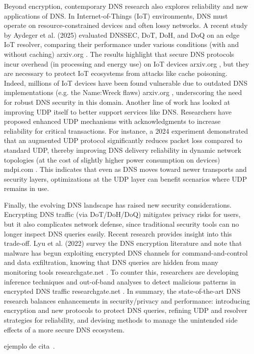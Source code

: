 Beyond encryption, contemporary DNS research also explores reliability and new applications of DNS. In Internet-of-Things (IoT) environments, DNS must operate on resource-constrained devices and often lossy networks. A recent study by Aydeger et al. (2025) evaluated DNSSEC, DoT, DoH, and DoQ on an edge IoT resolver, comparing their performance under various conditions (with and without caching)
arxiv.org
. The results highlight that secure DNS protocols incur overhead (in processing and energy use) on IoT devices
arxiv.org
, but they are necessary to protect IoT ecosystems from attacks like cache poisoning. Indeed, millions of IoT devices have been found vulnerable due to outdated DNS implementations (e.g. the Name:Wreck flaws)
arxiv.org
, underscoring the need for robust DNS security in this domain. Another line of work has looked at improving UDP itself to better support services like DNS. Researchers have proposed enhanced UDP mechanisms with acknowledgments to increase reliability for critical transactions. For instance, a 2024 experiment demonstrated that an augmented UDP protocol significantly reduces packet loss compared to standard UDP, thereby improving DNS delivery reliability in dynamic network topologies (at the cost of slightly higher power consumption on devices)
mdpi.com
. This indicates that even as DNS moves toward newer transports and security layers, optimizations at the UDP layer can benefit scenarios where UDP remains in use.

Finally, the evolving DNS landscape has raised new security considerations. Encrypting DNS traffic (via DoT/DoH/DoQ) mitigates privacy risks for users, but it also complicates network defense, since traditional security tools can no longer inspect DNS queries easily. Recent research provides insight into this trade-off. Lyu et al. (2022) survey the DNS encryption literature and note that malware has begun exploiting encrypted DNS channels for command-and-control and data exfiltration, knowing that DNS queries are hidden from many monitoring tools
researchgate.net
. To counter this, researchers are developing inference techniques and out-of-band analyses to detect malicious patterns in encrypted DNS traffic
researchgate.net
. In summary, the state-of-the-art DNS research balances enhancements in security/privacy and performance: introducing encryption and new protocols to protect DNS queries, refining UDP and resolver strategies for reliability, and devising methods to manage the unintended side effects of a more secure DNS ecosystem.

ejemplo de cita~\cite{rfc9114,rfc9000,rfc8446}.
